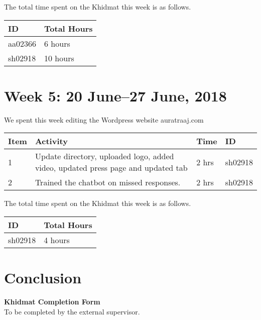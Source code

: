 \documentclass{article}
\begin{document}
The total time spent on the Khidmat this week is as follows.

\begin{tabular}{|l|l|}
  \hline
  ID & Total Hours\\\hline\hline
  aa02366 & 6 hours\\\hline
  sh02918 & 10 hours\\\hline
\end{tabular}

\newpage %
\section*{Week 5: 20 June--27 June, 2018}

We spent this week editing the Wordpress website auratraaj.com

\begin{tabular}{|l|l|l|l|}
  \hline
  Item 	& Activity & Time & ID \\\hline\hline
  1	& Update directory, uploaded logo, added video, updated press page and updated tab & 2 hrs & sh02918 \\\hline
  2	& Trained the chatbot on missed responses. & 2 hrs & sh02918\\\hline

\end{tabular}

The total time spent on the Khidmat this week is as follows.

\begin{tabular}{|l|l|}
  \hline
  ID & Total Hours\\\hline\hline
  sh02918 & 4 hours\\\hline
\end{tabular}

\newpage
\section*{Conclusion}


\newpage
\thispagestyle{empty}

\begin{center}
  {\Large\bf Khidmat Completion Form}\\[5pt]
  \small To be completed by the external supervisor.  
\end{center}
\bigskip
\end{document}
